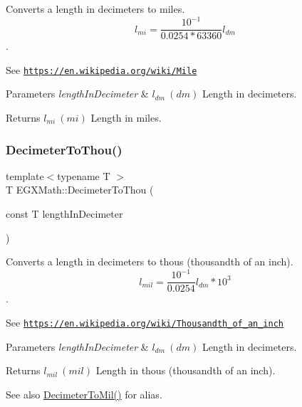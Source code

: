 Converts a length in decimeters to miles. \[ l_{mi}=\frac{10^{-1}}{0.0254 * 63360} l_{dm} \]. 

See \href{https://en.wikipedia.org/wiki/Mile}{\tt https\+://en.\+wikipedia.\+org/wiki/\+Mile} 
\begin{DoxyParams}{Parameters}
{\em length\+In\+Decimeter} & $ l_{dm}\ (dm)$ Length in decimeters. \\
\hline
\end{DoxyParams}
\begin{DoxyReturn}{Returns}
$ l_{mi}\ (mi)$ Length in miles. 
\end{DoxyReturn}
\mbox{\label{group___e_g_x_math-_conversions-_length_conversions-_s_i-_decimeter-_imperial_gafc294e549fcdd1c43545ca9624abcafb}} 
\subsubsection{\texorpdfstring{Decimeter\+To\+Thou()}{DecimeterToThou()}}
{\footnotesize\ttfamily template$<$typename T $>$ \\
T E\+G\+X\+Math\+::\+Decimeter\+To\+Thou (\begin{DoxyParamCaption}\item[{const T}]{length\+In\+Decimeter }\end{DoxyParamCaption})}



Converts a length in decimeters to thous (thousandth of an inch). \[ l_{mil}= \frac{10^{-1}}{0.0254} l_{dm} * 10^{3} \]. 

See \href{https://en.wikipedia.org/wiki/Thousandth_of_an_inch}{\tt https\+://en.\+wikipedia.\+org/wiki/\+Thousandth\+\_\+of\+\_\+an\+\_\+inch} 
\begin{DoxyParams}{Parameters}
{\em length\+In\+Decimeter} & $ l_{dm}\ (dm)$ Length in decimeters. \\
\hline
\end{DoxyParams}
\begin{DoxyReturn}{Returns}
$ l_{mil}\ (mil)$ Length in thous (thousandth of an inch). 
\end{DoxyReturn}
\begin{DoxySeeAlso}{See also}
\mbox{\hyperlink{group___e_g_x_math-_conversions-_length_conversions-_s_i-_decimeter-_imperial_gad2ce3f2de1fdda0216bdb56c4844b5e5}{Decimeter\+To\+Mil()}} for alias. 
\end{DoxySeeAlso}
\mbox{\label{group___e_g_x_math-_conversions-_length_conversions-_s_i-_decimeter-_imperial_ga2ffbd73da0cc3cbb36822127433e3267}} 
